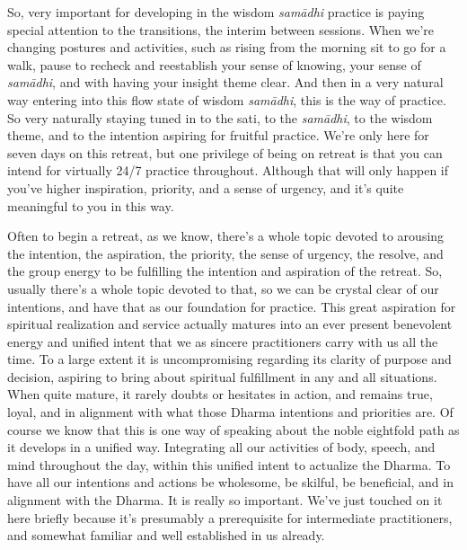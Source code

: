 \documentclass[12pt,openany]{book}
\begin{document}
So, very important for developing in the wisdom \textit{samādhi} practice is paying special attention to the transitions, the interim between sessions. When we’re changing postures and activities, such as rising from the morning sit to go for a walk, pause to recheck and reestablish your sense of knowing, your sense of \textit{samādhi}, and with having your insight theme clear. And then in a very natural way entering into this flow state of wisdom \textit{samādhi}, this is the way of practice. So very naturally staying tuned in to the sati, to the \textit{samādhi}, to the wisdom theme, and to the intention aspiring for fruitful practice. We’re only here for seven days on this retreat, but one privilege of being on retreat is that you can intend for virtually 24/7 practice throughout. Although that will only happen if you've higher inspiration, priority, and a sense of urgency, and it’s quite meaningful to you in this way.

Often to begin a retreat, as we know, there's a whole topic devoted to arousing the intention, the aspiration, the priority, the sense of urgency, the resolve, and the group energy to be fulfilling the intention and aspiration of the retreat. So, usually there's a whole topic devoted to that, so we can be crystal clear of our intentions, and have that as our foundation for practice. This great aspiration for spiritual realization and service actually matures into an ever present benevolent energy and unified intent that we as sincere practitioners carry with us all the time. To a large extent it is uncompromising regarding its clarity of purpose and decision, aspiring to bring about spiritual fulfillment in any and all situations. When quite mature, it rarely doubts or hesitates in action, and remains true, loyal, and in alignment with what those Dharma intentions and priorities are. Of course we know that this is one way of speaking about the noble eightfold path as it develops in a unified way. Integrating all our activities of body, speech, and mind throughout the day, within this unified intent to actualize the Dharma. To have all our intentions and actions be wholesome, be skilful, be beneficial, and in alignment with the Dharma. It is really so important. We’ve just touched on it here briefly because it's presumably a prerequisite for intermediate practitioners, and somewhat familiar and well established in us already. 
\end{document}
